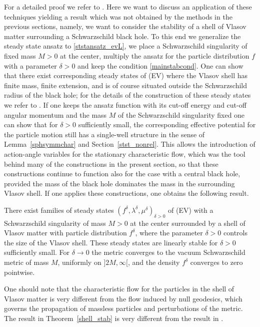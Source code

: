 \documentclass[11pt]{article}
\begin{document}
%
%
For a detailed proof we refer to \cite{GueStrRe}. Here we want to discuss an
application of these techniques yielding a result which was not obtained
by the methods in the previous sections, namely, we want to consider the
stability of a shell of Vlasov matter surrounding a Schwarzschild black
hole. To this end we generalize the steady state ansatz to
\eqref{ststansatz_evL}, we place a Schwarzschild singularity of fixed
mass $M>0$ at the center, multiply the ansatz for the particle distribution
$f$ with a parameter $\delta > 0$ and keep the condition
\eqref{mainstabcond}. One can show that there exist corresponding
steady states of (EV) where the Vlasov shell has finite mass, finite extension,
and is of course situated outside the Schwarzschild radius of the black hole;
for the details of the construction of these steady states we refer to
\cite[Section~2.2]{GueStrRe}.
If one keeps the ansatz function with its cut-off energy and
cut-off angular momentum and the mass $M$ of the Schwarzschild singularity
fixed one can show that for $\delta>0$ sufficiently
small, the corresponding effective potential for the particle motion
still has a single-well structure in the sense of Lemma~\ref{sphsymmchar}
and Section~\ref{stst_nonrel}. This allows the introduction of action-angle
variables for the stationary characteristic flow, which was the tool behind
many of the constructions in the present section, so that these
constructions continue to function also for the case with a central
black hole, provided the mass of the black hole dominates the mass in
the surrounding Vlasov shell. If one applies these constructions,
one obtains the following result.
%
%
\begin{theorem}\label{shell_stab}
  There exist families of steady states
  $(f^\delta,\lambda^\delta,\mu^\delta)_{\delta>0}$
  of (EV) with a Schwarzschild singularity of mass $M>0$ at the center
  surrounded by a shell of Vlasov matter with particle distribution
  $f^\delta$, where the parameter
  $\delta>0$ controls the size of the Vlasov shell.
  These steady states are linearly stable for $\delta>0$ sufficiently
  small.
  For $\delta\to 0$ the metric converges to the vacuum Schwarzschild
  metric of mass $M$, uniformly on $]2M,\infty[$,
  and the density $f^\delta$ converges to zero pointwise. 
\end{theorem}
%
%
One should note that the characteristic flow for the particles in the
shell of Vlasov matter is very different from the flow induced by
null geodesics, which governs the propagation of massless particles
and perturbations of the metric. The result in Theorem~\ref{shell_stab}
is very different from the result in \cite{DaHoRoTa}.
%
%
\end{document}
